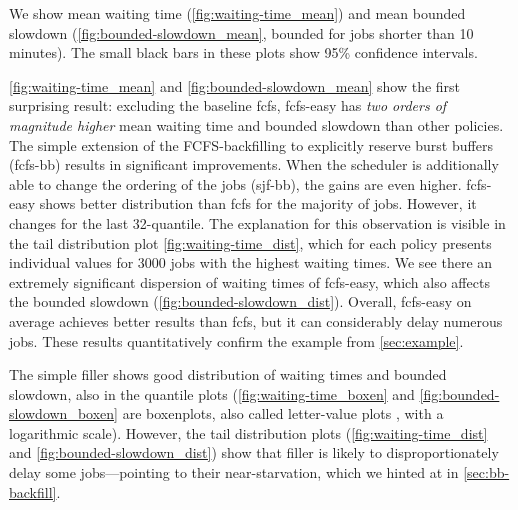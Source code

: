 \documentclass[runningheads]{llncs}
\begin{document}
\noindent We show mean waiting time (\cref{fig:waiting-time_mean}) and mean bounded slowdown (\cref{fig:bounded-slowdown_mean}, bounded for jobs shorter than 10 minutes). The small black bars in these plots show 95\% confidence intervals.

\cref{fig:waiting-time_mean} and \cref{fig:bounded-slowdown_mean} show the first surprising result: excluding the baseline fcfs, fcfs-easy has \emph{two orders of magnitude higher} mean waiting time and bounded slowdown than other policies.
The simple extension of the FCFS-backfilling to explicitly reserve burst buffers (fcfs-bb) results in significant improvements. When the scheduler is additionally able to change the ordering of the jobs (sjf-bb), the gains are even higher. 
fcfs-easy shows better distribution than fcfs for the majority of jobs. However, it changes for the last 32-quantile. The explanation for this observation is visible in the tail distribution plot \cref{fig:waiting-time_dist}, which for each policy presents individual values for 3000 jobs with the highest waiting times. We see there an extremely significant dispersion of waiting times of fcfs-easy, which also affects the bounded slowdown (\cref{fig:bounded-slowdown_dist}). Overall, fcfs-easy on average achieves better results than fcfs, but it can considerably delay numerous jobs. These results quantitatively confirm the example from \cref{sec:example}. %

The simple filler shows good distribution of waiting times and bounded slowdown, also in the quantile plots (\cref{fig:waiting-time_boxen} and \cref{fig:bounded-slowdown_boxen} are boxenplots, also called letter-value plots \cite{doi:10.1080/10618600.2017.1305277}, with a logarithmic scale). However, the tail distribution plots (\cref{fig:waiting-time_dist} and \cref{fig:bounded-slowdown_dist}) show that filler is likely to disproportionately delay some jobs---pointing to their near-starvation, which we hinted at in \cref{sec:bb-backfill}.
\end{document}
